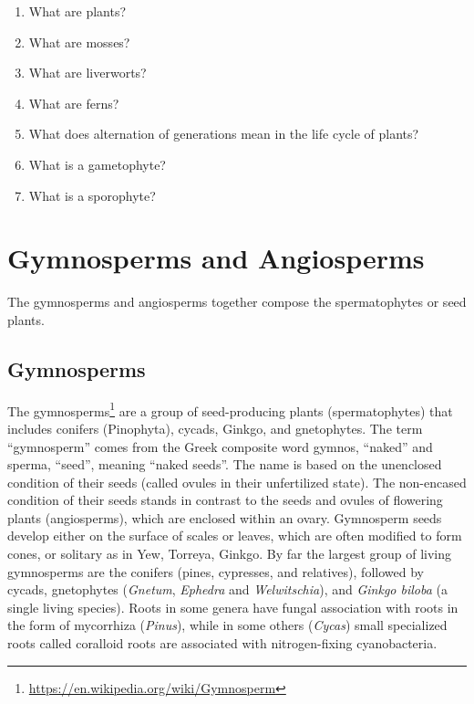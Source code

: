 \documentclass[]{book}
\providecommand{\tightlist}{%
  \setlength{\itemsep}{0pt}\setlength{\parskip}{0pt}}
\let\rmarkdownfootnote\footnote%
\def\footnote{\protect\rmarkdownfootnote}
\renewcommand{\href}[2]{#2\footnote{\url{#1}}}
\theoremstyle{definition}
\theoremstyle{definition}
\theoremstyle{definition}
\theoremstyle{remark}
\begin{document}
\begin{enumerate}
\def\labelenumi{\arabic{enumi}.}
\tightlist
\item
  What are plants?
\item
  What are mosses?
\item
  What are liverworts?
\item
  What are ferns?
\item
  What does alternation of generations mean in the life cycle of plants?
\item
  What is a gametophyte?
\item
  What is a sporophyte?
\end{enumerate}

\chapter{Gymnosperms and Angiosperms}\label{gymnosperms-and-angiosperms}

The gymnosperms and angiosperms together compose the spermatophytes or
seed plants.

\section{Gymnosperms}\label{gymnosperms}

The \href{https://en.wikipedia.org/wiki/Gymnosperm}{gymnosperms} are a
group of seed-producing plants (spermatophytes) that includes conifers
(Pinophyta), cycads, Ginkgo, and gnetophytes. The term ``gymnosperm''
comes from the Greek composite word gymnos, ``naked'' and sperma,
``seed'', meaning ``naked seeds''. The name is based on the unenclosed
condition of their seeds (called ovules in their unfertilized state).
The non-encased condition of their seeds stands in contrast to the seeds
and ovules of flowering plants (angiosperms), which are enclosed within
an ovary. Gymnosperm seeds develop either on the surface of scales or
leaves, which are often modified to form cones, or solitary as in Yew,
Torreya, Ginkgo. By far the largest group of living gymnosperms are the
conifers (pines, cypresses, and relatives), followed by cycads,
gnetophytes (\emph{Gnetum}, \emph{Ephedra} and \emph{Welwitschia}), and \emph{Ginkgo biloba} (a
single living species). Roots in some genera have fungal association
with roots in the form of mycorrhiza (\emph{Pinus}), while in some others
(\emph{Cycas}) small specialized roots called coralloid roots are associated
with nitrogen-fixing cyanobacteria.
\end{document}
